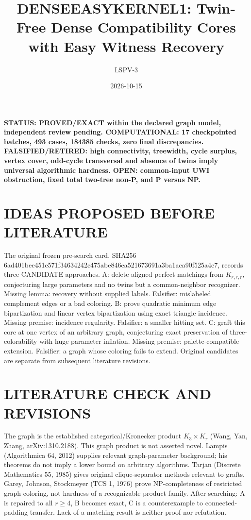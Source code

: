 \documentclass{article}
\title{DENSEEASYKERNEL1: Twin-Free Dense Compatibility Cores with Easy Witness Recovery}
\author{LSPV-3}
\date{2026-10-15}
\begin{document}
\maketitle
\noindent\textbf{STATUS: PROVED/EXACT within the declared graph model, independent review pending. COMPUTATIONAL: 17 checkpointed batches, 493 cases, 184385 checks, zero final discrepancies. FALSIFIED/RETIRED: high connectivity, treewidth, cycle surplus, vertex cover, odd-cycle transversal and absence of twins imply universal algorithmic hardness. OPEN: common-input UWI obstruction, fixed total two-tree non-P, and P versus NP.}

\section{IDEAS PROPOSED BEFORE LITERATURE}
The original frozen pre-search card, SHA256 6ad401bee451e571f34634242c475abe846ea521673691a3ba1aca90f525a4e7, records three CANDIDATE approaches. A: delete aligned perfect matchings from $K_{r,r,r}$, conjecturing large parameters and no twins but a common-neighbor recognizer. Missing lemma: recovery without supplied labels. Falsifier: mislabeled complement edges or a bad coloring. B: prove quadratic minimum edge bipartization and linear vertex bipartization using exact triangle incidence. Missing premise: incidence regularity. Falsifier: a smaller hitting set. C: graft this core at one vertex of an arbitrary graph, conjecturing exact preservation of three-colorability with huge parameter inflation. Missing premise: palette-compatible extension. Falsifier: a graph whose coloring fails to extend. Original candidates are separate from subsequent literature revisions.

\section{LITERATURE CHECK AND REVISIONS}
The graph is the established categorical/Kronecker product $K_3\times K_r$ (Wang, Yan, Zhang, arXiv:1310.2188). This graph product is not asserted novel. Lampis (Algorithmica 64, 2012) supplies relevant graph-parameter background; his theorems do not imply a lower bound on arbitrary algorithms. Tarjan (Discrete Mathematics 55, 1985) gives original clique-separator methods relevant to grafts. Garey, Johnson, Stockmeyer (TCS 1, 1976) prove NP-completeness of restricted graph coloring, not hardness of a recognizable product family. After searching: A is repaired to all $r\ge4$, B becomes exact, C is a counterexample to connected-padding transfer. Lack of a matching result is neither proof nor refutation.
\end{document}
